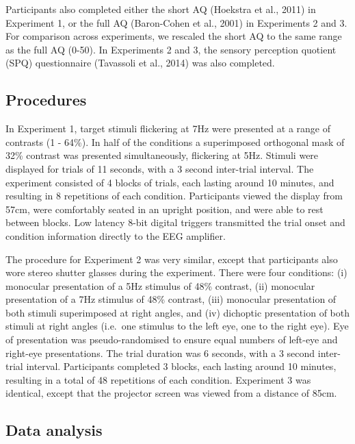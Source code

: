 \documentclass[
]{article}
\begin{document}
Participants also completed either the short AQ (Hoekstra et al., 2011) in Experiment 1, or the full AQ (Baron-Cohen et al., 2001) in Experiments 2 and 3. For comparison across experiments, we rescaled the short AQ to the same range as the full AQ (0-50). In Experiments 2 and 3, the sensory perception quotient (SPQ) questionnaire (Tavassoli et al., 2014) was also completed.

\hypertarget{procedures}{%
\subsection{Procedures}\label{procedures}}

In Experiment 1, target stimuli flickering at 7Hz were presented at a range of contrasts (1 - 64\%). In half of the conditions a superimposed orthogonal mask of 32\% contrast was presented simultaneously, flickering at 5Hz. Stimuli were displayed for trials of 11 seconds, with a 3 second inter-trial interval. The experiment consisted of 4 blocks of trials, each lasting around 10 minutes, and resulting in 8 repetitions of each condition. Participants viewed the display from 57cm, were comfortably seated in an upright position, and were able to rest between blocks. Low latency 8-bit digital triggers transmitted the trial onset and condition information directly to the EEG amplifier.

The procedure for Experiment 2 was very similar, except that participants also wore stereo shutter glasses during the experiment. There were four conditions: (i) monocular presentation of a 5Hz stimulus of 48\% contrast, (ii) monocular presentation of a 7Hz stimulus of 48\% contrast, (iii) monocular presentation of both stimuli superimposed at right angles, and (iv) dichoptic presentation of both stimuli at right angles (i.e.~one stimulus to the left eye, one to the right eye). Eye of presentation was pseudo-randomised to ensure equal numbers of left-eye and right-eye presentations. The trial duration was 6 seconds, with a 3 second inter-trial interval. Participants completed 3 blocks, each lasting around 10 minutes, resulting in a total of 48 repetitions of each condition. Experiment 3 was identical, except that the projector screen was viewed from a distance of 85cm.

\hypertarget{data-analysis}{%
\subsection{Data analysis}\label{data-analysis}}
\end{document}
